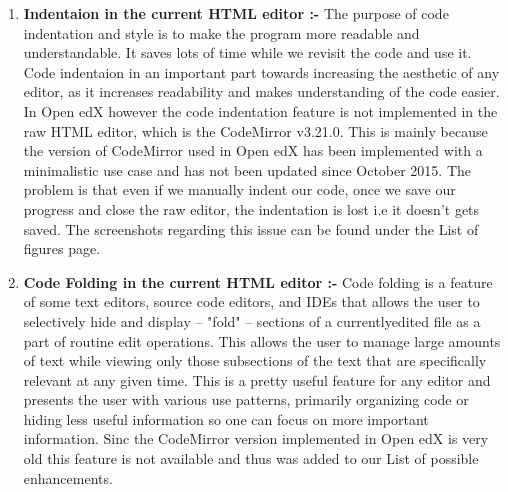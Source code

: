\begin{enumerate}
  \item \textbf{Indentaion in the current HTML editor :-}\newline\newline
The purpose of code indentation and style is to make the program more readable and
understandable. It saves lots of time while we revisit the code and use it.
Code indentaion in an important part towards increasing the aesthetic of any editor,
as it increases readability and makes understanding of the code easier.\newline\newline
In Open edX however the code indentation feature is not implemented in the raw
HTML editor, which is the CodeMirror v3.21.0. This is mainly because the version
of CodeMirror used in Open edX has been implemented with a minimalistic use case
and has not been updated since October 2015. The problem is that even if we
manually indent our code, once we save our progress and close the raw editor, the
indentation is lost i.e it doesn’t gets saved. The screenshots regarding this issue can
be found under the List of figures page.

  \item \textbf{Code Folding in the current HTML editor :-}\newline\newline
Code folding is a feature of some text editors, source code editors, and IDEs that
allows the user to selectively hide and display – "fold" – sections of a currentlyedited
file as a part of routine edit operations. This allows the user to manage large
amounts of text while viewing only those subsections of the text that are specifically
relevant at any given time.\newline\newline
This is a pretty useful feature for any editor and presents the user with various use
patterns, primarily organizing code or hiding less useful information so one can
focus on more important information. Sinc the CodeMirror version implemented in
Open edX is very old this feature is not available and thus was added to our List of
possible enhancements.


\end{enumerate}
